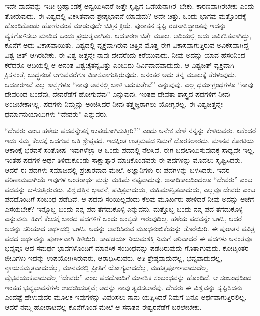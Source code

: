 ಇದೇ ವಾದವನ್ನು ಇಡೀ ಬ್ರಹ್ಮಾಂಡಕ್ಕೆ ಅನ್ವಯಿಸಿದರೆ ಚಿತ್ತೇ ಸೃಷ್ಟಿಗೆ ಒಡೆಯನಾಗಿರ\break\ ಬೇಕು. ಕಾರಣವಾಗಿರಬೇಕು ಎಂದು ತೋರುವುದು. ಈ ವಿಶ್ವದಲ್ಲಿ ವಿಕಸಿತವಾದ ಶ್ರೇಷ್ಠಭಾವನೆ ಯಾವುದು? ಅದೇ ಚಿತ್ತು. ಒಂದು ಭಾಗವು ಮತ್ತೊಂದಕ್ಕೆ ಹೊಂದಿಕೊಂಡು ಹೋಗುವಂತೆ ಮಾಡುವುದೇ ಚಿತ್ತಿನ ಕ್ರಿಯೆ. ಪುರಾತನ ಸೃಷ್ಟಿ ರಚನಾಸಿದ್ಧಾಂತವು ಇದನ್ನು ವ್ಯಕ್ತಗೊಳಿಸಲು ಮಾಡಿದ ಒಂದು ಪ್ರಯತ್ನವಾಗಿತ್ತು. ಆದಕಾರಣ ಚಿತ್ತೇ ಮೂಲ. ಆದಿಯಲ್ಲಿ ಅದು ಅವಿಕಸಿತವಾಗಿದ್ದು, ಕೊನೆಗೆ ಅದು ವಿಕಾಸವಾಯಿತು. ವಿಶ್ವದಲ್ಲಿ ವ್ಯಕ್ತವಾಗಿರುವ ಚಿತ್ತಿನ ಮೊತ್ತ ಈಗ ವಿಕಾಸವಾಗುತ್ತಿರುವ ಅವಿಕಸವಾಗಿದ್ದ ವಿಶ್ವ ಚಿತ್​ ಆಗಿರಬೇಕು. ಈ ವಿಶ್ವ ಚಿತ್ತನ್ನೇ ನಾವು ದೇವರೆಂದು ಕರೆಯುವುದು. ನೀವು ಅದನ್ನು ಯಾವ ಹೆಸರಿನಿಂದ ಕರೆದರೂ ಆದಿಯಲ್ಲಿ ಆ ಅನಂತ ವಿಶ್ವಚೈತನ್ಯವಿತ್ತು ಎಂಬುದು ನಿರ್ವಿವಾದವಾದುದು. ಆ ವಿಶ್ವಚಿತ್​ ವ್ಯಕ್ತವಾಗಿ ಕ್ರಿಸ್ತನಂತೆ, ಬುದ್ಧನಂತೆ ಆಗುವವರೆಗೂ ವಿಕಾಸವಾಗುತ್ತಿರುವುದು. ಅನಂತರ ಅದು ತನ್ನ ಮೂಲಕ್ಕೆ ತೆರಳುವುದು. ಆದಕಾರಣವೆ ಎಲ್ಲ ಶಾಸ್ತ್ರಗಳೂ “ನಾವು ಅವನಲ್ಲಿ ಬಾಳಿ ಬದುಕುತ್ತೇವೆ” ಎನ್ನುವುವು. ಎಲ್ಲ ಧರ್ಮಗ್ರಂಥಗಳೂ “ನಾವು ದೇವರಿಂದ ಬಂದೆವು, ದೇವರೆಡೆಗೆ ಹೋಗುವೆವು” ಎನ್ನುವುವು. ಇಂತಹ ದೇವತಾ ಶಾಸ್ತ್ರದ ಪದಗಳಿಗೆ ನೀವು ಅಂಜಬೇಕಾಗಿಲ್ಲ. ಪದಗಳು ನಿಮ್ಮನ್ನು ಅಂಜಿಸಿದರೆ ನೀವು ತತ್ತ್ವಜ್ಞರಾಗಲು ಯೋಗ್ಯರಲ್ಲ. ಈ ವಿಶ್ವಚಿತ್ತನ್ನೇ ಧರ್ಮಾನುಯಾಯಿಗಳು “ದೇವರು” ಎನ್ನುವರು.

\vskip 0.3cm

“ದೇವರು ಎಂಬ ಹಳೆಯ ಪದವನ್ನೇತಕ್ಕೆ ಉಪಯೋಗಿಸುತ್ತೀರಿ?” ಎಂದು ಅನೇಕ ವೇಳೆ ನನ್ನನ್ನು ಕೇಳಿರುವರು. ಏಕೆಂದರೆ ಇದು ನಮ್ಮ ಕೆಲಸಕ್ಕೆ ಒದಗುವ ಅತಿ ಶ್ರೇಷ್ಠಪದ. ಇದಕ್ಕಿಂತ ಉತ್ತಮಪದ ನಿಮಗೆ ದೊರಕಲಾರದು. ಮಾನವ ಕೋಟಿಯ ಆಕಾಂಕ್ಷೆ ಭರವಸೆ ಸಂತೋಷ–ಇವುಗಳೆಲ್ಲಾ ಆ ಒಂದು ಪದದಲ್ಲಿ ನೆಲಸಿವೆ. ಈಗ ಬದಲಾಯಿಸುವುದಕ್ಕೆ ಸಾಧ್ಯವೇ ಇಲ್ಲ. ಇಂತಹ ಪದಗಳ ಅರ್ಥ ತಿಳಿದುಕೊಂಡು ಸಾಕ್ಷಾತ್ಕಾರ ಮಾಡಿಕೊಂಡವರು ಈ ಪದಗಳನ್ನು ಮೊದಲು ಸೃಷ್ಟಿಸಿದರು. ಆದರೆ ಈ ಪದಗಳು ಸಮಾಜದಲ್ಲಿ ಪ್ರಚಾರವಾದ ಮೇಲೆ, ಅಜ್ಞಾನಿಗಳು ಈ ಪದಗಳನ್ನು ಬಳಸಿದರು. ಇದರ ಪರಿಣಾಮವಾಗಿಯೆ ಇವುಗಳ ಅಂತರಾರ್ಥ ಮತ್ತು ಮಹಿಮೆ ನಷ್ಟವಾದುವು. ಅನಾದಿಕಾಲದಿಂದಲೂ “ದೇವರು” ಎಂಬ ಪದವನ್ನು ಬಳಸುತ್ತಿರುವರು. ವಿಶ್ವಚಿತ್ತಿನ ಭಾವನೆ, ಪವಿತ್ರವಾದುದು, ಮಹಿಮಾನ್ವಿತವಾದುದು, ಎಲ್ಲವೂ ದೇವರು ಎಂಬ ಪದದೊಂದಿಗೆ ಸಂಬಂಧ ಪಡೆದಿವೆ. ಆ ಪದವು ಸರಿಯಿಲ್ಲವೆಂದು ಕೆಲವು ಮೂರ್ಖರು ಹೇಳಿದರೆ ನೀವು ಅದನ್ನು ಆಚೆಗೆ ಎಸೆಯಬೇಕೆ? ಇನ್ನೊಬ್ಬ ಬಂದು ನನ್ನ ಪದ ತೆಗೆದುಕೊಳ್ಳಿ ಎನ್ನುವನು. ಮತ್ತೊಬ್ಬ ಬಂದು ನನ್ನ ಪದ ತೆಗೆದುಕೊಳ್ಳಿ ಎನ್ನುವನು. ಹೀಗೆ ಕೆಲಸಕ್ಕೆ ಬಾರದ ಪದಗಳಿಗೆ ಒಂದು ಅಂತ್ಯವೇ ಇರುವುದಿಲ್ಲ. ಹಳೆಯ ಪದವನ್ನೇ ಬಳಸಿ, ಆದರೆ ಅದನ್ನು ಸರಿಯಾದ ಅರ್ಥದಲ್ಲಿ ಬಳಸಿ. ಅದನ್ನು ಆವರಿಸಿರುವ ಮೂಢನಂಬಿಕೆಯನ್ನು ತೊರೆಯಿರಿ. ಈ ಪುರಾತನ ಪವಿತ್ರ ಪದದ ಅರ್ಥವನ್ನು ಪೂರ್ಣವಾಗಿ ತಿಳಿಯಿರಿ. ಸಾಹಚರ್ಯ ನಿಯಮಶಕ್ತಿ ನಿಮಗೆ ಅರಿವಾದರೆ ಈ ಪದಗಳು ಅನಂತವೂ ಭವ್ಯವೂ ಆದ ಸಮರ್ಥ ಭಾವಗಳೊಂದಿಗೆ ಮಾನಸಿಕ ಸಂಬಂಧವನ್ನು ಪಡೆದಿರುವುದು ಗೊತ್ತಾಗುವುದು. ಕೋಟ್ಯಂತರ ಜೀವಿಗಳು ಇದನ್ನು ಉಪಯೋಗಿಸಿರುವರು, ಆರಾಧಿಸಿರುವರು. ಅತಿ ಶ್ರೇಷ್ಠವಾದುದೆಲ್ಲ, ಭವ್ಯವಾದುದೆಲ್ಲ, ನ್ಯಾಯಸಮ್ಮತವಾದುದೆಲ್ಲ, ಮಾನವರಲ್ಲಿ ಪ್ರೀತಿಗೆ ಯೋಗ್ಯವಾದದೆಲ್ಲ, ಮಹತ್ವಪೂರ್ಣವಾದುದೆಲ್ಲ, ವೈಭವಯುಕ್ತವಾದುದೆಲ್ಲ “ದೇವರು” ಎಂಬ ಪದದೊಂದಿಗೆ ಮಾನಸಿಕ ಸಂಬಂಧವನ್ನು ಹೊಂದಿದೆ. ಆ ಸಂಬಂಧದಿಂದ ಇಂತಹ ಭವ್ಯಭಾವನೆಗಳು ಉದಯಿಸುತ್ತವೆ; ಅದನ್ನು ನಾವು ತ್ಯಜಿಸಲಾರೆವು. ದೇವರು ಈ ವಿಶ್ವವನ್ನು ಸೃಷ್ಟಿಸಿದನು ಎಂದಷ್ಟೆ ಹೇಳುವುದರ ಮೂಲಕ ಇವುಗಳನ್ನು ವಿವರಿಸಲು ನಾನು ಯತ್ನಿಸಿದರೆ ನಿಮಗೆ ಏನೂ ಅರ್ಥವಾಗುತ್ತಿರಲಿಲ್ಲ. ಆದರೆ ನಮ್ಮ ಹೋರಾಟವೆಲ್ಲ ಕೊನೆಗೊಂಡ ಮೇಲೆ ಆ ಸನಾತನ ಈಶ್ವರನೆಡೆಗೆ ಬರಲೇಬೇಕು.

